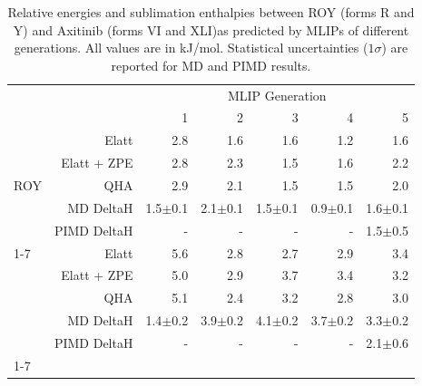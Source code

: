 \begin{table}[h]

\caption{\label{tab:pharma_deltaH}Relative energies and sublimation enthalpies between ROY (forms R and Y) and Axitinib (forms VI and XLI)as predicted by MLIPs of different generations. All values are in kJ/mol. Statistical uncertainties ($1\sigma$) are reported for MD and PIMD results.}
\begin{tabular}{lrrrrrr}
\toprule
 &  & \multicolumn{5}{c}{MLIP Generation} \\ 
 &  & 1 & 2 & 3 & 4 & 5 \\
\midrule
\multirow[c]{5}{*}{ROY} & Elatt & 2.8 & 1.6 & 1.6 & 1.2 & 1.6 \\
 & Elatt + ZPE & 2.8 & 2.3 & 1.5 & 1.6 & 2.2 \\
 & QHA & 2.9 & 2.1 & 1.5 & 1.5 & 2.0 \\
 & MD DeltaH & 1.5$\pm$0.1 & 2.1$\pm$0.1 & 1.5$\pm$0.1 & 0.9$\pm$0.1 & 1.6$\pm$0.1 \\
 & PIMD DeltaH & - & - & - & - & 1.5$\pm$0.5 \\
\cline{1-7}
\multirow[c]{5}{*}{Axitinib} & Elatt & 5.6 & 2.8 & 2.7 & 2.9 & 3.4 \\
 & Elatt + ZPE & 5.0 & 2.9 & 3.7 & 3.4 & 3.2 \\
 & QHA & 5.1 & 2.4 & 3.2 & 2.8 & 3.0 \\
 & MD DeltaH & 1.4$\pm$0.2 & 3.9$\pm$0.2 & 4.1$\pm$0.2 & 3.7$\pm$0.2 & 3.3$\pm$0.2 \\
 & PIMD DeltaH & - & - & - & - & 2.1$\pm$0.6 \\
\cline{1-7}
\bottomrule
\end{tabular}

\end{table}